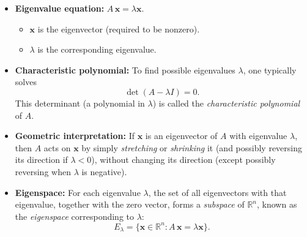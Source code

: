 \begin{itemize}
\item \textbf{Eigenvalue equation:} $A\,\mathbf{x} = \lambda \mathbf{x}.$
  \begin{itemize}
    \item $\mathbf{x}$ is the eigenvector (required to be nonzero).
    \item $\lambda$ is the corresponding eigenvalue.
  \end{itemize}

\item \textbf{Characteristic polynomial:} 
  To find possible eigenvalues $\lambda$, one typically solves
  \[
    \det(A - \lambda I) = 0.
  \]
  This determinant (a polynomial in $\lambda$) is called the 
  \emph{characteristic polynomial} of $A$.

\item \textbf{Geometric interpretation:} 
  If $\mathbf{x}$ is an eigenvector of $A$ with eigenvalue $\lambda$, 
  then $A$ acts on $\mathbf{x}$ by simply \emph{stretching} or \emph{shrinking} it 
  (and possibly reversing its direction if $\lambda < 0$), without changing its direction 
  (except possibly reversing when $\lambda$ is negative).

\item \textbf{Eigenspace:} 
  For each eigenvalue $\lambda$, the set of all eigenvectors with that eigenvalue, 
  together with the zero vector, forms a \emph{subspace} of $\mathbb{R}^n$, known as the 
  \emph{eigenspace} corresponding to $\lambda$:
  \[
    E_\lambda = \{\mathbf{x} \in \mathbb{R}^n : A\,\mathbf{x} = \lambda \mathbf{x}\}.
  \]
\end{itemize}

